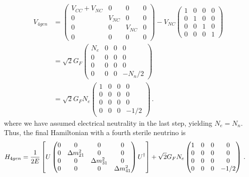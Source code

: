 \begin{align}\label{eq:Vsterile}
    V_{4gen} &=
    \begin{pmatrix}
        V_{CC} + V_{NC} & 0 & 0 & 0 \\
        0 &V_{NC} & 0 & 0 \\
        0 & 0 & V_{NC} & 0 \\
        0 & 0 & 0 & 0 
    \end{pmatrix} - V_{NC}\begin{pmatrix}
        1 & 0 & 0 & 0 \\
        0 &1 & 0 & 0 \\
        0 & 0 & 1 & 0 \\
        0 & 0 & 0 & 1 
    \end{pmatrix} \nonumber \\
    &= \sqrt{2}G_F\begin{pmatrix}
        N_e & 0 & 0 & 0 \\
        0 &0 & 0 & 0 \\
        0 & 0 & 0 & 0 \\
        0 & 0 & 0 & -N_n/2
    \end{pmatrix} \nonumber \\
    &=\sqrt{2}G_F N_e\begin{pmatrix}
        1 & 0 & 0 & 0 \\
        0 &0 & 0 & 0 \\
        0 & 0 & 0 & 0 \\
        0 & 0 & 0 & -1/2
    \end{pmatrix}\,.
\end{align}
where we have assumed electrical neutrality in the last step, yielding $N_e = N_n$.
Thus, the final Hamiltonian with a fourth sterile neutrino is 
\begin{align}\label{eq:H_4gen}
    H_{4gen} &= \frac{1}{2E}\left[U \begin{pmatrix}
            0 & 0 & 0 & 0\\
            0 & \dm_{21} & 0  & 0 \\
            0 & 0 & \dm_{31} & 0 \\
            0 & 0 & 0 & \dm_{41} \\
        \end{pmatrix} U^\dagger\right] + \sqrt{2}G_F N_e 
        \begin{pmatrix}
            1 & 0 & 0 & 0 \\
            0 & 0 & 0 & 0 \\
            0 & 0 & 0 & 0 \\
            0 & 0 & 0 & -1/2
        \end{pmatrix}\,. 
\end{align}


